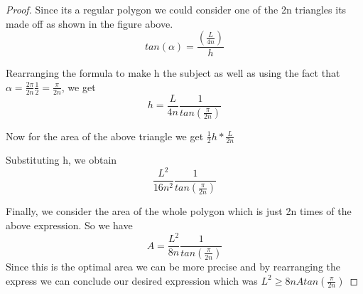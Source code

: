 \documentclass[a4paper]{book}
\begin{document}
\begin{proof}
    Since its a regular polygon we could consider one of the 2n triangles its made off as shown in the figure above. $$tan(\alpha)=\frac{(\frac{L}{4n})}{h}$$
    
    Rearranging the formula to make h the subject as well as using the fact that $\alpha=\frac{2\pi}{2n} \frac{1}{2}=\frac{\pi}{2n}$, we get $$h=\frac{L}{4n} \frac{1}{tan(\frac{\pi}{2n})}$$
    
    Now for the area of the above triangle we get $\frac{1}{2}h*\frac{L}{2n}$ 
    
    Substituting h, we obtain $$\frac{L^{2}}{16n^{2}} \frac{1}{tan(\frac{\pi}{2n})}$$

    Finally, we consider the area of the whole polygon which is just 2n times of the above expression. So we have 
    $$A=\frac{L^{2}}{8n} \frac{1}{tan(\frac{\pi}{2n})}$$
    Since this is the optimal area we can be more precise and by rearranging the express we can conclude our desired expression which was $L^{2} \ge 8nAtan(\frac{\pi}{2n})$
\end{proof}
\end{document}
